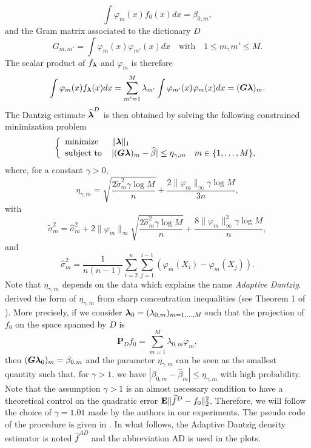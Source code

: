 \begin{equation}
      \int \varphi_m(x)f_0(x)dx=\beta_{0,m},
\end{equation}
and the Gram matrix associated to the dictionary $D$
\begin{equation}
    G_{m,m'}=\int\varphi_m(x)\varphi_{m'}(x)dx \quad \text{with}\quad 1\leq m,m' \leq M.
\end{equation}
The scalar product of $f_{\boldsymbol \lambda}$ and $\varphi_m$ is therefore
\begin{equation}
    \int\varphi_m(x)f_{\boldsymbol \lambda}(x)dx = \sum_{m'=1}^M\lambda_{m'}\int\varphi_{m'}(x)\varphi_m(x)dx = (\boldsymbol G\boldsymbol \lambda)_m.
\end{equation}
The Dantzig estimate $\widehat{\boldsymbol \lambda}^D$ is then obtained by solving the following constrained minimization problem
\begin{equation*}
    \left\{
    \begin{array}{ll}
        \text{minimize}\, &\|\boldsymbol \lambda\|_1 \\
        \text{subject to}\, &|(\boldsymbol G\boldsymbol \lambda)_m-\widehat\beta|\leq \eta_{\gamma,m} \quad m\in \{1,\dots,M\},
    \end{array} \right.
\end{equation*}
where, for a constant $\gamma > 0$,
\begin{equation}
    \eta_{\gamma,m} = \sqrt{\frac{2\tilde\sigma_m^2\gamma\log{M}}{n}}+ \frac{2\|\varphi_m\|_{\infty}\gamma\log{M}}{3n},
\end{equation}
with
\begin{equation}
    \tilde\sigma_m^2 = \hat\sigma_m^2+2\|\varphi_m \|_{\infty}\sqrt{\frac{2\hat\sigma_m^2\gamma\log{M}}{n}}+ \frac{8\|\varphi_m\|_{\infty}^2\gamma\log{M}}{n},
\end{equation}
and
\begin{equation}
    \hat\sigma^2_m = \frac{1}{n(n-1)}\sum_{i=2}^n\sum_{j=1}^{i-1}(\varphi_m(X_i)-\varphi_m(X_j)).
\end{equation}
Note that $\eta_{\gamma,m}$ depends on the data which explains the name \textit{Adaptive Dantzig}. \citep{Bertin} derived the form of $\eta_{\gamma,m}$ from sharp concentration inequalities (see Theorem 1 of \citep{Bertin}). More precisely, if we consider $\boldsymbol \lambda_0=(\lambda_{0,m})_{m=1,\dots,M}$ such that the projection of $f_0$ on the space spanned by $D$ is
\begin{equation}
    \textbf{P}_{D}f_0=\sum_{m=1}^M\lambda_{0,m}\varphi_m,
\end{equation}
then $(\boldsymbol G\boldsymbol \lambda_0)_m=\beta_{0,m}$ and the parameter $\eta_{\gamma,m}$ can be seen as the smallest quantity such that, for $\gamma > 1$, we have $|\beta_{0,m}-\hat\beta_m|\leq \eta_{\gamma,m}$ with high probability. Note that the assumption $\gamma > 1$ is an almost necessary condition to have a theoretical control on the quadratic error $\mathbf E\|\widehat f^D-f_0 \|^2_2$. Therefore, we will follow the choice of $\gamma=1.01$ made by the authors in our experiments. The pseudo code of the procedure is given in . In what follows, the Adaptive Dantzig density estimator is noted $\hat f ^{AD}$ and the abbreviation AD is used in the plots.

